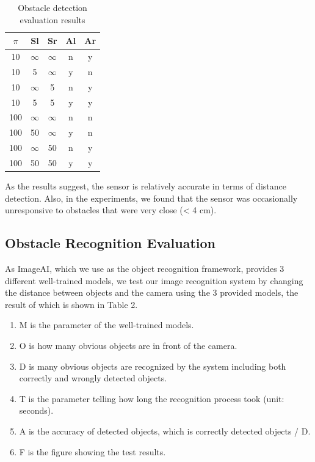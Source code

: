 \begin{table}
  \caption{Obstacle detection evaluation results}
  \label{tab:freq}
  \begin{tabular}{ccccc}
    \toprule
    $\pi$ & Sl & Sr & Al & Ar \\
    \midrule
    10 & $\infty$ & $\infty$ & n & y  \\
    10 & 5 & $\infty$ & y & n  \\
    10 & $\infty$ & 5 & n & y  \\
    10 & 5 & 5 & y & y  \\
    100 & $\infty$ & $\infty$ & n & n  \\
    100 & 50 & $\infty$ & y & n  \\
    100 & $\infty$ & 50 & n & y  \\
    100 & 50 & 50 & y & y  \\
  \bottomrule
\end{tabular}
\end{table}

As the results suggest, the sensor is relatively accurate in terms of distance detection. Also, in the experiments, we found that the sensor was occasionally unresponsive to obstacles that were very close (< 4 cm).

\subsection{Obstacle Recognition Evaluation} 
As ImageAI, which we use as the object recognition framework, provides 3 different well-trained models, we test our image recognition system by changing the distance between objects and the camera using the 3 provided models, the result of which is shown in Table 2.
\begin{enumerate}
  \item M is the parameter of the well-trained models.
  \item O is how many obvious objects are in front of the camera.
  \item D is many obvious objects are recognized by the system including both correctly and wrongly detected objects.
  \item T is the parameter telling how long the recognition process took (unit: seconds).
  \item A is the accuracy of detected objects, which is correctly detected objects / D.
  \item F is the figure showing the test results.
\end{enumerate}

